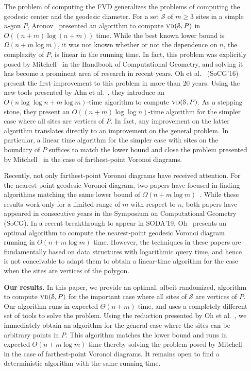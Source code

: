\documentclass[a4paper,UKenglish]{socg-lipics-v2018}
\newcommand{\s}{\mathcal S}
\newcommand{\vd}[2][P]{\textsc{vd}(#2, #1)}
\begin{document}
The problem of computing the FVD generalizes the problems of computing the geodesic center and the geodesic diameter.  
For a set $\s$ of $m\geq 3$ sites in a simple $n$-gon $P$, Aronov~\cite{aronov1993furthest} presented an algorithm to compute $\vd{\s}$ in $O((n+m)\log (n+ m))$ time.  
While the best known lower bound is $\Omega(n + m \log m)$, it was not known whether or not the dependence on $n$, the complexity of $P$, is linear in the running time.  
In fact, this problem was explicitly posed by Mitchell~\cite[Chapter 27]{m-gspno-00} in the Handbook of Computational Geometry, and solving it has become a prominent area of research in recent years.
Oh et al.~\cite{oh2016farthest} (SoCG'16) present the first improvement to this problem in more than 20 years. 
Using the new tools presented by Ahn et al.~\cite{ahn2015linear}, they introduce an $O(n \log\log n+m\log m)$-time algorithm to compute $\vd{\s}$. 
As a stepping stone, they present an $O((n+m)\log\log n)$-time algorithm for the simpler case where all sites are vertices of $P$.
In fact, any improvement on the latter algorithm translates directly to an improvement on the general problem.
In particular, a linear time algorithm for the simpler case with sites on the boundary of $P$ suffices to match the lower bound and close the problem presented by Mitchell~\cite[Chapter 27]{m-gspno-00} in the case of farthest-point Voronoi diagrams.

Recently, not only farthest-point Voronoi diagrams have received attention. 
For the nearest-point geodesic Voronoi diagram, two papers have focused in finding algorithms matching the same lower bound of $\Omega(n + m\log m)$~\cite{chihungVoronoi,oh2017voronoi}.
While these results work only for a limited range of $m$ with respect to $n$, both papers have appeared in consecutive years in the Symposium on Computational Geometry (SoCG). In a recent breakthrough to appear in SODA'19, Oh~\cite{oh2019SODA} presents an optimal algorithm to compute the nearest-point geodesic Voronoi diagram running in $O(n + m \log m)$ time.
However, the techniques in these papers are fundamentally based on data structures with logarithmic query time, and hence is not conceivable to adapt them to obtain a linear-time algorithm for the case when the sites are vertices of the polygon. 

\textbf{Our results.} 
In this paper, we provide an optimal, albeit randomized, algorithm to compute $\vd{\s}$ for the important case where all sites of $\s$ are vertices of $P$.
Our algorithm runs in expected $\Theta(n + m)$ time, and uses a completely different set of tools to solve the problem. 
Using the reduction presented by Oh et al.~\cite{oh2016farthest}, we immediately obtain an algorithm for the general case where the sites can be arbitrary points in $P$.
This algorithm matches the lower bound and runs in expected $\Theta(n + m\log m)$ time thereby solving the problem posed by Mitchell~\cite[Chapter 27]{m-gspno-00} in the case of farthest-point Voronoi diagrams.
It remains open to find a deterministic algorithm with the same running time.
\end{document}
